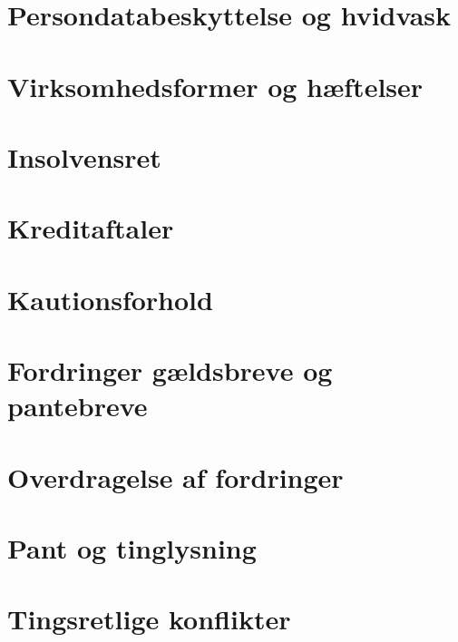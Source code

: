 \documentclass[]{book}
\begin{document}
\hypertarget{persondatabeskyttelse-og-hvidvask}{%
\chapter{Persondatabeskyttelse og hvidvask}\label{persondatabeskyttelse-og-hvidvask}}

\hypertarget{virksomhedsformer-og-hftelser}{%
\chapter{Virksomhedsformer og hæftelser}\label{virksomhedsformer-og-hftelser}}

\hypertarget{insolvensret}{%
\chapter{Insolvensret}\label{insolvensret}}

\hypertarget{kreditaftaler}{%
\chapter{Kreditaftaler}\label{kreditaftaler}}

\hypertarget{kautionsforhold}{%
\chapter{Kautionsforhold}\label{kautionsforhold}}

\hypertarget{fordringer-gldsbreve-og-pantebreve}{%
\chapter{Fordringer gældsbreve og pantebreve}\label{fordringer-gldsbreve-og-pantebreve}}

\hypertarget{overdragelse-af-fordringer}{%
\chapter{Overdragelse af fordringer}\label{overdragelse-af-fordringer}}

\hypertarget{pant-og-tinglysning}{%
\chapter{Pant og tinglysning}\label{pant-og-tinglysning}}

\hypertarget{tingsretlige-konflikter}{%
\chapter{Tingsretlige konflikter}\label{tingsretlige-konflikter}}
\end{document}
